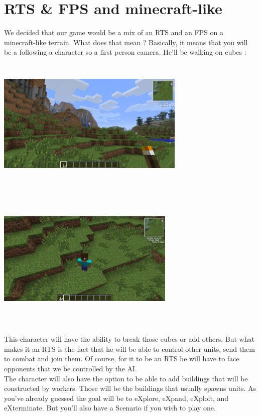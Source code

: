 \documentclass[article]{report} %
\begin{document}
						\section{RTS \& FPS and minecraft-like}
								We decided that our game would be a mix of an RTS and an FPS on a minecraft-like terrain. What does that mean ? Basically, it means that you will be a following a character so a first person camera. He'll be walking on cubes :\\ %
								\includegraphics[width=9cm,   height=7cm]{Images/Terrain.png}
								\includegraphics[width=8.5cm, height=7cm]{Images/Terrain2.png}
								
								
								This character will have the ability to break those cubes or add others. But what makes it an RTS is the fact that he will be able to control other units, send them to combat and join them. Of course, for it to be an RTS he will have to face opponents that we be controlled by the AI.\\
								
								The character will also have the option to be able to add buildings that will be constructed by workers. Those will be the buildings that usually spawns units.\newline
								As you've already guessed the goal will be to eXplore, eXpand, eXploit, and eXterminate. But you'll also have a Scenario if you wish to play one.\newline
\end{document}
